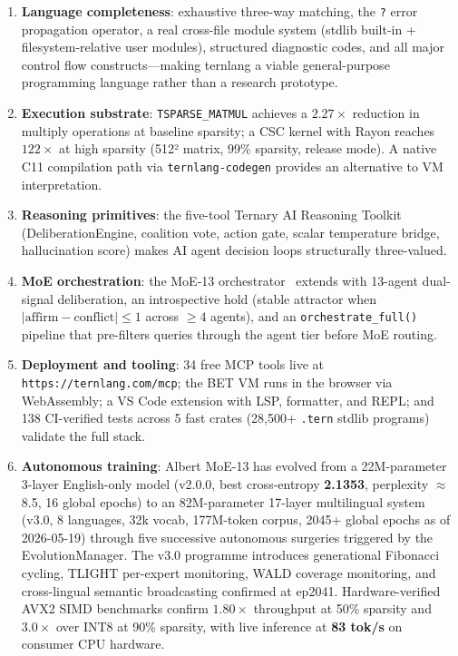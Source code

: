 \documentclass[11pt,a4paper]{article}
\begin{document}
\begin{enumerate}
  \item \textbf{Language completeness}: exhaustive three-way matching, the
        \texttt{?} error propagation operator, a real cross-file module system
        (stdlib built-in + filesystem-relative user modules), structured
        diagnostic codes, and all major control flow constructs—making ternlang
        a viable general-purpose programming language rather than a research
        prototype.

  \item \textbf{Execution substrate}: \texttt{TSPARSE\_MATMUL} achieves a
        $2.27\times$ reduction in multiply operations at baseline sparsity;
        a CSC kernel with Rayon reaches $122\times$ at high sparsity (512²
        matrix, 99\% sparsity, release mode). A native C11 compilation path
        via \texttt{ternlang-codegen} provides an alternative to VM
        interpretation.

  \item \textbf{Reasoning primitives}: the five-tool Ternary AI Reasoning
        Toolkit (DeliberationEngine, coalition vote, action gate, scalar
        temperature bridge, hallucination score) makes AI agent decision loops
        structurally three-valued.

  \item \textbf{MoE orchestration}: the MoE-13 orchestrator~\cite{moe13_2026}
        extends with 13-agent dual-signal deliberation, an introspective hold
        (stable attractor when $|\text{affirm} - \text{conflict}| \leq 1$
        across $\geq 4$ agents), and an \texttt{orchestrate\_full()} pipeline
        that pre-filters queries through the agent tier before MoE routing.

  \item \textbf{Deployment and tooling}: 34 free MCP tools live at
        \texttt{https://ternlang.com/mcp}; the BET VM runs in the browser via
        WebAssembly; a VS Code extension with LSP, formatter, and REPL; and
        138 CI-verified tests across 5 fast crates
        (28,500+ \texttt{.tern} stdlib programs) validate the full stack.

  \item \textbf{Autonomous training}: Albert MoE-13 has evolved from a 22M-parameter
        3-layer English-only model (v2.0.0, best cross-entropy \textbf{2.1353},
        perplexity $\approx$8.5, 16 global epochs) to an 82M-parameter 17-layer
        multilingual system (v3.0, 8 languages, 32k vocab, 177M-token corpus,
        2045+ global epochs as of 2026-05-19) through five successive autonomous
        surgeries triggered by the EvolutionManager. The v3.0 programme introduces
        generational Fibonacci cycling, TLIGHT per-expert monitoring, WALD coverage
        monitoring, and cross-lingual semantic broadcasting confirmed at ep2041.
        Hardware-verified AVX2 SIMD benchmarks confirm $1.80\times$ throughput at
        50\% sparsity and $3.0\times$ over INT8 at 90\% sparsity, with live
        inference at \textbf{83 tok/s} on consumer CPU hardware.
\end{enumerate}
\end{document}
